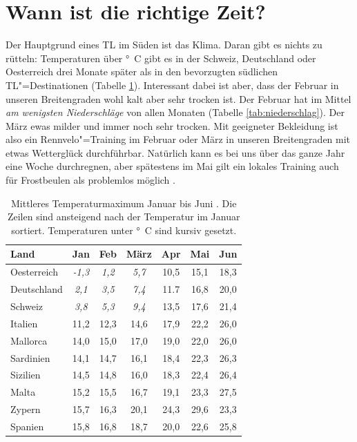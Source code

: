 \documentclass[a4paper,DIV13,BCOR0cm,draft=TRUE]{scrartcl}
\newcommand{\rv}{Rennvelo}
\begin{document}
\section{Wann ist die richtige Zeit?}
\label{sec:richtigezeit}

Der Hauptgrund eines TL im Süden ist das Klima.
Daran gibt es nichts zu rütteln: Temperaturen über \unit[10]{\degree C} gibt es in der Schweiz, Deutschland oder Oesterreich
drei Monate später als in den bevorzugten südlichen TL"=Destinationen (Tabelle \ref{tab:tempmax}).
Interessant dabei ist aber, dass der Februar in unseren Breitengraden
wohl kalt aber sehr trocken ist.
Der Februar hat im Mittel \textit{am wenigsten Niederschläge} von allen Monaten (Tabelle \ref{tab:niederschlag}).
Der März ewas milder und immer noch sehr trocken.
Mit geeigneter Bekleidung ist also ein \rv"=Training im Februar oder März
in unseren Breitengraden mit etwas Wetterglück durchführbar.
Natürlich kann es bei uns über das ganze Jahr eine Woche durchregnen, aber spätestens im Mai gilt ein
lokales Training auch für Frostbeulen als problemlos möglich \cite{capricorn2015ausland,raimi272015wetter}.

\begin{table}
        \centering
        \begin{tabular}{lcccccc}
                \toprule
                 Land & Jan & Feb & März & Apr & Mai & Jun \\
                 \midrule
                 Oesterreich     & \textit{-1,3} & \textit{1,2} & \textit{5,7} & 10,5 & 15,1 & 18,3 \\
                 Deutschland    & \textit{2,1} & \textit{3,5} & \textit{7,4} & 11.7 & 16,8 & 20,0 \\
                 Schweiz        & \textit{3,8} & \textit{5,3} & \textit{9,4} & 13,5 & 17,6 & 21,4 \\
                 Italien        & 11,2 & 12,3 & 14,6 & 17,9 & 22,2 & 26,0 \\
                Mallorca        & 14,0 & 15,0 & 17,0 & 19,0 & 22,0 & 26,0 \\
                Sardinien   & 14,1 & 14,7 & 16,1 & 18,4 & 22,3 & 26,3 \\
                Sizilien    & 14,5 & 14,8 & 16,0 & 18,3 & 22,4 & 26,4 \\
                Malta       & 15,2 & 15,5 & 16,7 & 19,1 & 23,3 & 27,5 \\
                 Zypern         & 15,7 & 16,3 & 20,1 & 24,3 & 29,6 & 23,3\\
                 Spanien        & 15,8 & 16,8 & 18,7 & 20,0 & 22,6 & 25,8 \\
                 \bottomrule
        \end{tabular}
        \caption{
            Mittleres Temperaturmaximum Januar bis Juni \protect\cite{rtl2015klima}.
            Die Zeilen sind ansteigend nach der Temperatur im Januar sortiert.
            Temperaturen unter \protect\unit[10]{\degree C} sind kursiv gesetzt.
            }
        \label{tab:tempmax}
\end{table}
\end{document}
